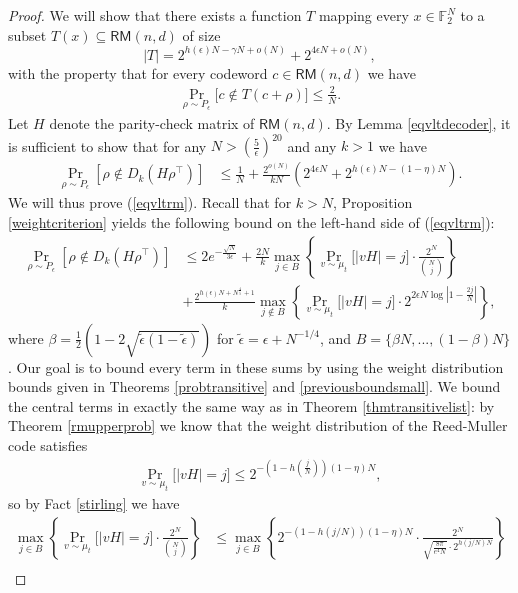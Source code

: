 \documentclass[12pt]{article}
\newcommand{\F}{\mathbb{F}}
\begin{document}
\begin{proof}
We will show that there exists a function $T$ mapping every $x\in\F_2^N$ to a subset $T(x)\subseteq  \mathsf{RM}(n,d)$ of size
         $$|T|=2^{h(\epsilon)N-\gamma N+o(N)}+2^{4\epsilon N+o(N)} ,$$
     with the property that for every codeword $c\in  \mathsf{RM}(n,d)$ we have
    \begin{align*}
    \Pr_{\rho\sim P_\epsilon}\big[c\notin T(c+\rho)\big]\leq
   \frac{2}{N}.
    \end{align*}
Let $H$ denote the parity-check matrix of $\mathsf{RM}(n,d)$. By Lemma \ref{eqvltdecoder}, it is sufficient to show that for any $N> \left(\frac{5}{\epsilon}\right)^{20}$ and any $k>1$ we have
\begin{align}\label{eqvltrm}
\Pr_{\rho\sim P_\epsilon}[\rho\notin D_k(H\rho^\intercal)]
&\leq \frac{1}{N}+\frac{2^{o(N)}}{kN}\left(2^{4\epsilon N}+
  2^{h(\epsilon)N-(1-\eta)N}\right).
\end{align}
We will thus prove (\ref{eqvltrm}).  Recall that for $k>N$, Proposition \ref{weightcriterion} yields the following bound on the left-hand side of (\ref{eqvltrm}):
\begin{align}\label{thmbdrm}
\Pr_{\rho\sim P_\epsilon}[\rho\notin D_k(H\rho^\intercal)]&\leq 2e^{-\frac{\sqrt{N}}{3\epsilon}}+\frac{2N}{k} \max_{j\in B}\left\{ \Pr_{v\sim \mu_t}\big[|v H|=j\big] \cdot \frac{2^N}{\binom{N}{j}}\right\} \nonumber\\
&+\frac{2^{h(\epsilon)N+N^{\frac{4}{5}}+1}}{k}  \max_{ j\notin B}\left\{ \Pr_{v\sim \mu_t}\big[|v H|=j\big]\cdot 2^{2\epsilon N\log|1-\frac{2j}{N}|} \right\},
\end{align}
where $\beta=\frac{1}{2}\left( 1-2\sqrt{\tilde{\epsilon}(1-\tilde{\epsilon})} \right)$ for $\tilde{\epsilon}=\epsilon+N^{-1/4}$, and 
$B=\{\beta N,...,(1-\beta )N\}$. Our goal is to bound every term in these sums by using the weight distribution bounds given in Theorems \ref{probtransitive} and \ref{previousboundsmall}. We bound the central terms in exactly the same way as in Theorem \ref{thmtransitivelist}: by Theorem \ref{rmupperprob} we know that the weight distribution of the Reed-Muller code satisfies
\begin{align*}
    \Pr_{v\sim\mu_t}\big[|vH|=j \big]\leq 2^{-(1-h(\frac{j}{N}))(1-\eta) N},
\end{align*}
so by Fact \ref{stirling} we have 
\begin{align*}
    \max_{j\in B}\left\{ \Pr_{v\sim\mu_t}\big[|vH|=j \big]\cdot \frac{2^N}{\binom{N}{j}}  \right\}&\leq \max_{j\in B}\left\{  2^{-(1-h(j/N))(1-\eta) N}\cdot \frac{2^N}{\sqrt{\frac{8\pi}{e^4 N}}\cdot2^{h(j/N)N}}  \right\}\\

\end{align*}
\end{proof}
\end{document}
